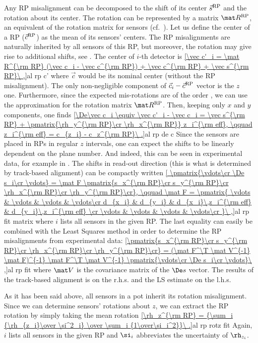 Any RP misalignment can be decomposed to the shift of its center $\vec s^{\rm RP}$ and the rotation about its center. The rotation can be represented by a matrix $\mat R^{\rm RP}$, an equivalent of the rotation matrix for sensors (cf.~). Let us define the center of a RP ($\vec c^{\rm RP}$) as the mean of its sensors' centers. The RP misalignments are naturally inherited by all sensors of this RP, but moreover, the rotation may give rise to additional shifts, see . The center of $i$-th detector is
\eqref{\vec c'_i = \mat R^{\rm RP} (\vec c_i - \vec c^{\rm RP}) + \vec c^{\rm RP} + \vec s^{\rm RP}\ ,}{al rp c'}
where $\vec c$ would be its nominal center (without the RP misalignment). The only non-negligible component of $\vec c_i - \vec c^{\rm RP}$ vector is the $z$ one. Furthermore, since the expected mis-rotations are of the order , we can use the approximation  for the rotation matrix $\mat R^{\rm RP}$. Then, keeping only $x$ and $y$ components, one finds
\eqref{\De\vec c_i \equiv \vec c'_i - \vec c_i = \vec s^{\rm RP} + \pmatrix{\rh_y^{\rm RP}\cr \rh_x^{\rm RP}} z_i^{\rm eff}, \qquad z_i^{\rm eff} = c_{z_i} - c_z^{\rm RP}\ .}{al rp de c}
Since the sensors are placed in RPs in regular $z$ intervals, one can expect the shifts to be linearly dependent on the plane number. And indeed, this can be seen in experimental data, for example in . The shifts in read-out direction (this is what is determined by track-based alignment) can be compactly written
\eqref{
\pmatrix{\vdots\cr \De s_i\cr \vdots} = \mat F \pmatrix{s_x^{\rm RP}\cr s_y^{\rm RP}\cr \rh_x^{\rm RP}\cr \rh_y^{\rm RP}\cr}, \qquad
\mat F = \pmatrix{
\vdots & \vdots & \vdots & \vdots\cr
d_{x_i} & d_{y_i} & d_{x_i}\,z_i^{\rm eff} & d_{y_i}\,z_i^{\rm eff} \cr
\vdots & \vdots & \vdots & \vdots\cr
}\ ,}{al rp fit matrix}
where $i$ lists all sensors in the given RP. The last equality can easily be combined with the Least Squares method in order to determine the RP misalignments from experimental data:
\eqref{\pmatrix{s_x^{\rm RP}\cr s_y^{\rm RP}\cr \rh_x^{\rm RP}\cr \rh_y^{\rm RP}\cr} = (\mat F^\T \mat V^{-1} \mat F)^{-1} \mat F^\T \mat V^{-1} \pmatrix{\vdots\cr \De s_i\cr \vdots}\ ,}{al rp fit}
where $\mat V$ is the covariance matrix of the $\De s$ vector. The results of the track-based alignment is on the r.h.s. and the LS estimate on the l.h.s. 

As it has been said above, all sensors in a pot inherit its rotation misalignment. Since we can determine sensors' rotations about $z$, we can extract the RP rotation by simply taking the mean rotation
\eqref{\rh_z^{\rm RP} = {\sum_i {\rh_{z_i}\over \si^2_i} \over \sum_i {1\over\si_i^2}}\ .}{al rp rotz fit}
Again, $i$ lists all sensors in the given RP and $\si_i$ abbreviates the uncertainty of $\rh_{z_i}$.

